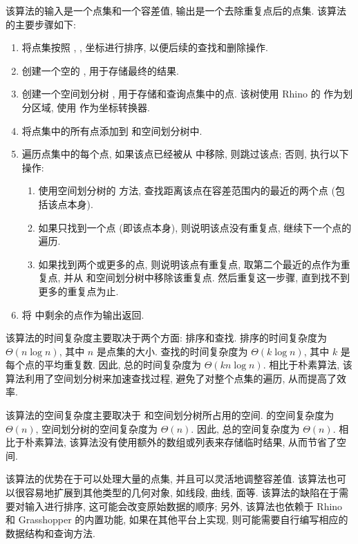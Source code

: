 该算法的输入是一个点集和一个容差值, 输出是一个去除重复点后的点集.
该算法的主要步骤如下:
\begin{enumerate}
  \item 将点集按照 , ,  坐标进行排序, 以便后续的查找和删除操作.
  \item 创建一个空的 , 用于存储最终的结果.
  \item 创建一个空间划分树 , 用于存储和查询点集中的点.
        该树使用 Rhino 的  作为划分区域, 使用  作为坐标转换器.
  \item 将点集中的所有点添加到  和空间划分树中.
  \item 遍历点集中的每个点, 如果该点已经被从  中移除, 则跳过该点; 否则, 执行以下操作:
        \begin{enumerate}
          \item 使用空间划分树的  方法, 查找距离该点在容差范围内的最近的两个点 (包括该点本身).
          \item 如果只找到一个点 (即该点本身), 则说明该点没有重复点, 继续下一个点的遍历.
          \item 如果找到两个或更多的点, 则说明该点有重复点, 取第二个最近的点作为重复点, 并从  和空间划分树中移除该重复点.
                然后重复这一步骤, 直到找不到更多的重复点为止.
        \end{enumerate}
  \item 将  中剩余的点作为输出返回.
\end{enumerate}

该算法的时间复杂度主要取决于两个方面: 排序和查找.
排序的时间复杂度为 $\Theta(n \log{n})$, 其中 $n$ 是点集的大小.
查找的时间复杂度为 $\Theta(k \log{n})$, 其中 $k$ 是每个点的平均重复数.
因此, 总的时间复杂度为 $\Theta(k n \log{n})$.
相比于朴素算法, 该算法利用了空间划分树来加速查找过程, 避免了对整个点集的遍历, 从而提高了效率.

该算法的空间复杂度主要取决于  和空间划分树所占用的空间.
 的空间复杂度为 $\Theta(n)$, 空间划分树的空间复杂度为 $\Theta(n)$.
因此, 总的空间复杂度为 $\Theta(n)$.
相比于朴素算法, 该算法没有使用额外的数组或列表来存储临时结果, 从而节省了空间.

该算法的优势在于可以处理大量的点集, 并且可以灵活地调整容差值.
该算法也可以很容易地扩展到其他类型的几何对象, 如线段, 曲线, 面等.
该算法的缺陷在于需要对输入进行排序, 这可能会改变原始数据的顺序; 另外, 该算法也依赖于 Rhino 和 Grasshopper 的内置功能, 如果在其他平台上实现, 则可能需要自行编写相应的数据结构和查询方法.

